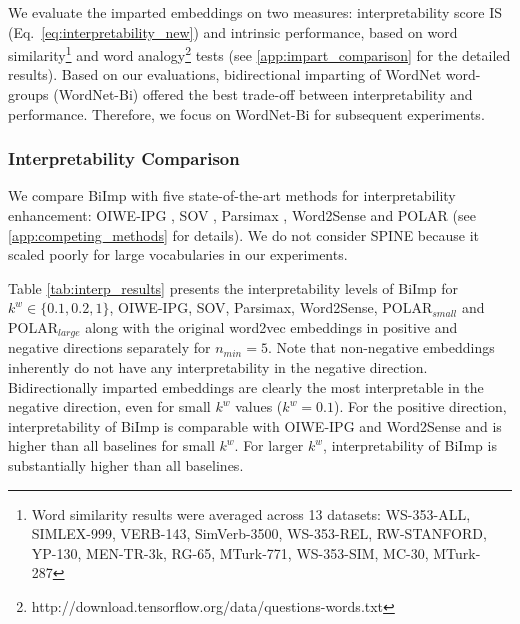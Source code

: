 \documentclass[11pt,a4paper]{article}
\def\proposedmethod{BiImp}
\begin{document}
We evaluate the  imparted embeddings
on two measures: 
interpretability score IS (Eq.\
\eqref{eq:interpretability_new}) and intrinsic performance,
based on word similarity\footnote{Word similarity results
  were averaged across 13 datasets: WS-353-ALL, SIMLEX-999,
  VERB-143, SimVerb-3500, WS-353-REL, RW-STANFORD, YP-130,
  MEN-TR-3k, RG-65, MTurk-771, WS-353-SIM, MC-30, MTurk-287}
\citep{faruqui14communityEval} and word
analogy\footnote{http://download.tensorflow.org/data/questions-words.txt}
\citep{mikolov13word2vec_b} tests (see
\ref{app:impart_comparison} for the detailed results). Based
on our evaluations, bidirectional imparting of WordNet
word-groups (WordNet-Bi) offered the best trade-off between
interpretability and performance. Therefore, we focus on
WordNet-Bi for subsequent experiments.



\subsubsection{Interpretability Comparison}
We compare \proposedmethod{}
with five state-of-the-art methods for interpretability
enhancement: OIWE-IPG \citep{luo15online}, SOV
\citep{faruqui15sparse}, Parsimax \citep{park17rotated},
Word2Sense \citep{panigrahi19word2sense} and POLAR
\citep{mathew20polar} (see \ref{app:competing_methods} for
details).
We do not consider
SPINE \citep{subramanian18spine}  because it scaled poorly
for large vocabularies in our experiments.

Table
\ref{tab:interp_results} presents the interpretability
levels of \proposedmethod{} for $k^w \in \{0.1, 0.2, 1\}$,
OIWE-IPG, SOV, Parsimax, Word2Sense, POLAR$_{small}$ and
POLAR$_{large}$ along with the original word2vec embeddings
in positive and negative directions separately for $n_{min}
= 5$.  Note that non-negative embeddings inherently do not
have any interpretability in the negative
direction. Bidirectionally imparted embeddings are
clearly the most interpretable in the negative direction,
even for small $k^w$ values
($k^w = 0.1$). For the positive direction, interpretability
of \proposedmethod{} is comparable with OIWE-IPG and
Word2Sense and is higher than all baselines for
small $k^w$. For larger $k^w$, interpretability of
\proposedmethod{} is substantially higher than all baselines.
\end{document}
